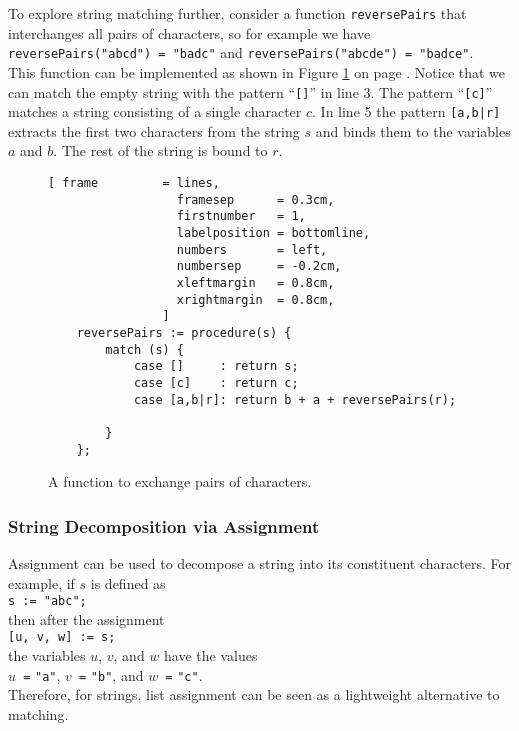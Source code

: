 To explore string matching further, consider a function \texttt{reversePairs} that interchanges all pairs
of characters, so for example we have
\\[0.2cm]
\hspace*{1.3cm}
\texttt{reversePairs("abcd") = "badc"} \quad and \quad
\texttt{reversePairs("abcde") = "badce"}. 
\\[0.2cm]
This function can be implemented as shown in Figure \ref{fig:reverse-pairs.stlx} on page
\pageref{fig:reverse-pairs.stlx}.  Notice that we can match the empty string with the pattern
``\texttt{[]}'' in line 3.  The pattern ``\texttt{[c]}'' matches a string consisting of a single
character $c$.  In line 5 the pattern \texttt{[a,b|r]} extracts the first two
characters from the string $s$ and binds them to the variables $a$ and $b$.  The rest of the string is
bound to $r$.

\begin{figure}[!ht]
\centering
\begin{Verbatim}[ frame         = lines, 
                  framesep      = 0.3cm, 
                  firstnumber   = 1,
                  labelposition = bottomline,
                  numbers       = left,
                  numbersep     = -0.2cm,
                  xleftmargin   = 0.8cm,
                  xrightmargin  = 0.8cm,
                ]
    reversePairs := procedure(s) {
        match (s) {
            case []     : return s;
            case [c]    : return c;
            case [a,b|r]: return b + a + reversePairs(r);
    
        }
    };
\end{Verbatim}
\vspace*{-0.3cm}
\caption{A function to exchange pairs of characters.}
\label{fig:reverse-pairs.stlx}
\end{figure}

\subsubsection{String Decomposition via Assignment}
Assignment can be used to decompose a string into its constituent characters.  For
example, if $s$ is defined as
\\[0.2cm]
\hspace*{1.3cm}
\texttt{s := }\verb|"abc";|
\\[0.2cm]
then after the assignment
\\[0.2cm]
\hspace*{1.3cm}
\texttt{[u, v, w] := s;}
\\[0.2cm]
the variables $u$, $v$, and $w$ have the values
\\[0.2cm]
\hspace*{1.3cm}
\texttt{$u$ =} \verb|"a"|, \quad
\texttt{$v$ =} \verb|"b"|, \quad and \quad
\texttt{$w$ =} \verb|"c"|. 
\\[0.2cm]
Therefore, for strings, list assignment can be seen as a lightweight alternative to matching.

